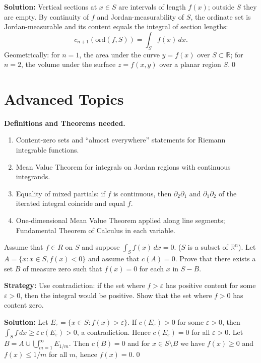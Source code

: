 \bigskip\noindent\textbf{Solution:}
Vertical sections at $x\in S$ are intervals of length $f(x)$; outside $S$ they are empty. By continuity of $f$ and Jordan-measurability of $S$, the ordinate set is Jordan-measurable and its content equals the integral of section lengths:
\[ c_{n+1}(\text{ord}(f,S)) = \int_S f(x)\,dx. \]
Geometrically: for $n=1$, the area under the curve $y=f(x)$ over $S\subset\mathbb R$; for $n=2$, the volume under the surface $z=f(x,y)$ over a planar region $S$.\qed
\section{Advanced Topics}
\noindent\textbf{Definitions and Theorems needed.}
\begin{enumerate}[label=(\roman*)]
    \item Content-zero sets and ``almost everywhere'' statements for Riemann integrable functions.
    \item Mean Value Theorem for integrals on Jordan regions with continuous integrands.
    \item Equality of mixed partials: if $f$ is continuous, then $\partial_2\partial_1$ and $\partial_1\partial_2$ of the iterated integral coincide and equal $f$.
    \item One-dimensional Mean Value Theorem applied along line segments; Fundamental Theorem of Calculus in each variable.
\end{enumerate}



\begin{problembox}
Assume that \( f \in R \) on \( S \) and suppose \( \int_S f(x) \, dx = 0 \). (\( S \) is a subset of \( \mathbb{R}^n \)). Let \( A = \{ x : x \in S, f(x) < 0 \} \) and assume that \( c(A) = 0 \). Prove that there exists a set \( B \) of measure zero such that \( f(x) = 0 \) for each \( x \) in \( S - B \).
\end{problembox}

\noindent\textbf{Strategy:} Use contradiction: if the set where $f>\varepsilon$ has positive content for some $\varepsilon>0$, then the integral would be positive. Show that the set where $f>0$ has content zero.

\bigskip\noindent\textbf{Solution:}
Let $E_\varepsilon=\{x\in S:f(x)>\varepsilon\}$. If $c(E_\varepsilon)>0$ for some $\varepsilon>0$, then $\int_S f\,dx\ge \varepsilon\,c(E_\varepsilon)>0$, a contradiction. Hence $c(E_\varepsilon)=0$ for all $\varepsilon>0$. Let $B=A\cup\bigcup_{m=1}^\infty E_{1/m}$. Then $c(B)=0$ and for $x\in S\setminus B$ we have $f(x)\ge 0$ and $f(x)\le 1/m$ for all $m$, hence $f(x)=0$.\qed


